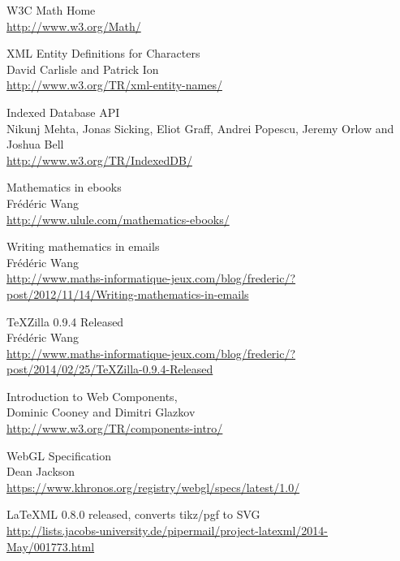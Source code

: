 \begin{thebibliography}{8}
W3C Math Home \\
\href{http://www.w3.org/Math/}{http://www.w3.org/Math/}

XML Entity Definitions for Characters \\
David Carlisle and Patrick Ion \\
\href{http://www.w3.org/TR/xml-entity-names/}{http://www.w3.org/TR/xml-entity-names/}

Indexed Database API \\
Nikunj Mehta, Jonas Sicking, Eliot Graff, Andrei Popescu, Jeremy Orlow and
Joshua Bell \\
\href{http://www.w3.org/TR/IndexedDB/}{http://www.w3.org/TR/IndexedDB/}

Mathematics in ebooks \\
Frédéric Wang \\
\href{http://www.ulule.com/mathematics-ebooks/}{http://www.ulule.com/mathematics-ebooks/}

Writing mathematics in emails \\
Frédéric Wang \\
\href{http://www.maths-informatique-jeux.com/blog/frederic/?post/2012/11/14/Writing-mathematics-in-emails}{http://www.maths-informatique-jeux.com/blog/frederic/?post/2012/11/14/Writing-mathematics-in-emails}

TeXZilla 0.9.4 Released \\
Frédéric Wang \\
\href{http://www.maths-informatique-jeux.com/blog/frederic/?post/2014/02/25/TeXZilla-0.9.4-Released}{http://www.maths-informatique-jeux.com/blog/frederic/?post/2014/02/25/TeXZilla-0.9.4-Released}

Introduction to Web Components, \\
Dominic Cooney and Dimitri Glazkov \\
\href{http://www.w3.org/TR/components-intro/}{http://www.w3.org/TR/components-intro/}

WebGL Specification \\
Dean Jackson \\
\href{https://www.khronos.org/registry/webgl/specs/latest/1.0/}{https://www.khronos.org/registry/webgl/specs/latest/1.0/}

LaTeXML 0.8.0 released, converts tikz/pgf to SVG \\
\href{http://lists.jacobs-university.de/pipermail/project-latexml/2014-May/001773.html}{http://lists.jacobs-university.de/pipermail/project-latexml/2014-May/001773.html}

\end{thebibliography}

